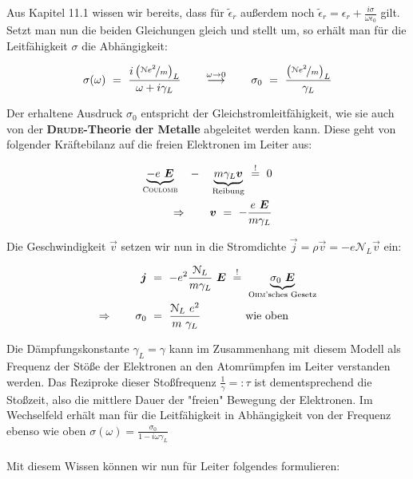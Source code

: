 \newpage
Aus Kapitel 11.1 wissen wir bereits, dass für $\tilde{\epsilon}_r$ außerdem noch $\tilde{\epsilon}_r = \epsilon_r + \frac{i\sigma}{\omega\epsilon_0}$ gilt. Setzt man nun die beiden Gleichungen gleich und stellt um, so erhält man für die Leitfähigkeit $\sigma$ die Abhängigkeit:

\begin{equation*}
\sigma(\omega) \ = \ \frac{i\left(\nicefrac{\mathcal{N}e^2}{m}\right)_L}{\omega + i \gamma_L} \qquad \overset{\omega\rightarrow0}{\longrightarrow}\qquad \sigma_0  \ = \ \frac{\left(\nicefrac{\mathcal{N}e^2}{m}\right)_L}{\gamma_L}	
\end{equation*}

Der erhaltene Ausdruck $\sigma_0$ entspricht der Gleichstromleitfähigkeit, wie sie auch von der \textbf{\textsc{Drude}-Theorie der Metalle} abgeleitet werden kann. Diese geht von folgender Kräftebilanz auf die freien Elektronen im Leiter aus:

\begin{align*}
\underbrace{-e\ \vec{E}}_{\textsc{Coulomb}} \quad - \quad \underbrace{m \gamma_L\vec{v}}_{\text{Reibung}}  \ \overset{!}{=} \ 0\\
\Rightarrow \qquad \vec{v}  \ = \  -\frac{e \ \vec{E}}{m \gamma_L} 
\end{align*}

Die Geschwindigkeit $\vec{v}$ setzen wir nun in die Stromdichte $\vec{j} = \rho\vec{v} = -e \mathcal{N}_L \vec{v}$ ein:

\begin{align*}
\vec{j}  \ &= \ -e^2 \frac{\mathcal{N}_L}{m\gamma_L} \ \vec{E} \ \overset{!}{=} \ \underbrace{\sigma_0 \ \vec{E}}_{\text{\textsc{Ohm}'sches Gesetz}}\\
\Rightarrow \qquad \sigma_0  \ &= \ \frac{\mathcal{N}_L \ e^2}{m \ \gamma_L} \qquad\qquad\text{wie oben}
\end{align*}

Die Dämpfungskonstante $\gamma_L = \gamma$ kann im Zusammenhang mit diesem Modell als Frequenz der Stöße der Elektronen an den Atomrümpfen im Leiter verstanden werden. Das Reziproke dieser Stoßfrequenz $\frac{1}{\gamma}=: \tau$  ist dementsprechend die Stoßzeit, also die mittlere Dauer der "freien" Bewegung der Elektronen. Im Wechselfeld erhält man für die Leitfähigkeit in Abhängigkeit von der Frequenz ebenso wie oben $\sigma(\omega) = \frac{\sigma_0}{1-i\omega\gamma_L}$\\
\ \\
Mit diesem Wissen können wir nun für Leiter folgendes formulieren:

